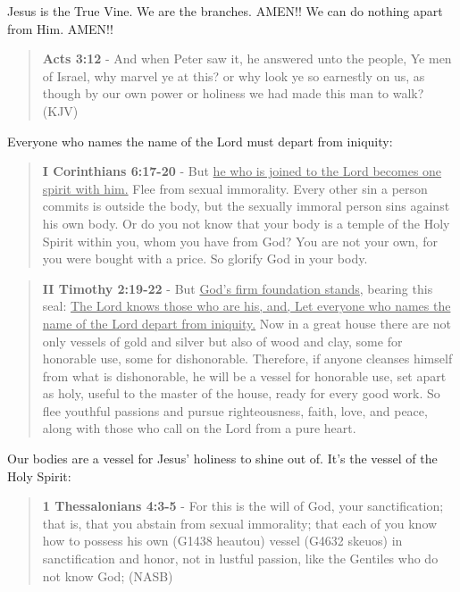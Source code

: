 \documentclass[11pt]{article}
\begin{document}
Jesus is the True Vine. We are the branches. AMEN!! We can do nothing apart from Him. AMEN!!

\begin{quote}
\textbf{Acts 3:12} - And when Peter saw it, he answered unto the people, Ye men of Israel, why marvel ye at this? or why look ye so earnestly on us, as though by our own power or holiness we had made this man to walk? (KJV)
\end{quote}

Everyone who names the name of the Lord must depart from iniquity:

\begin{quote}
\textbf{I Corinthians 6:17-20} - But \uline{he who is joined to the Lord becomes one spirit with him.} Flee from sexual immorality. Every other sin a person commits is outside the body, but the sexually immoral person sins against his own body. Or do you not know that your body is a temple of the Holy Spirit within you, whom you have from God? You are not your own, for you were bought with a price. So glorify God in your body.
\end{quote}

\begin{quote}
\textbf{II Timothy 2:19-22} - But \uline{God's firm foundation stands,} bearing this seal: \uline{The Lord knows those who are his, and, Let everyone who names the name of the Lord depart from iniquity.} Now in a great house there are not only vessels of gold and silver but also of wood and clay, some for honorable use, some for dishonorable. Therefore, if anyone cleanses himself from what is dishonorable, he will be a vessel for honorable use, set apart as holy, useful to the master of the house, ready for every good work. So flee youthful passions and pursue righteousness, faith, love, and peace, along with those who call on the Lord from a pure heart.
\end{quote}

Our bodies are a vessel for Jesus' holiness to shine out of. It's the vessel of the Holy Spirit:

\begin{quote}
\textbf{1 Thessalonians 4:3-5} - For this is the will of God, your sanctification; that is, that you abstain from sexual immorality; that each of you know how to possess his own (G1438 heautou) vessel (G4632 skeuos) in sanctification and honor, not in lustful passion, like the Gentiles who do not know God; (NASB)
\end{quote}
\end{document}
